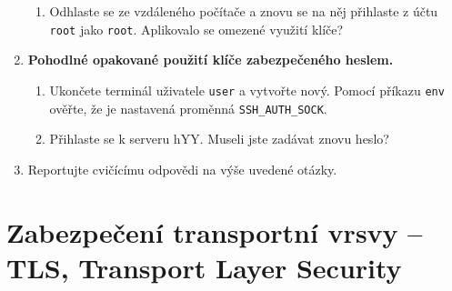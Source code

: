\documentclass[a4paper,11pt]{article}
\begin{document}
\begin{enumerate}
\begin{enumerate}
      \item Odhlaste se ze vzdáleného počítače a znovu se na něj přihlaste z
        účtu {\tt root} jako {\tt root}. Aplikovalo se
        omezené využití klíče?

    \end{enumerate}


  \item {\bf Pohodlné opakované použití klíče zabezpečeného heslem.}

    \begin{enumerate}

      \item Ukončete terminál uživatele {\tt user} a vytvořte nový. Pomocí
        příkazu \verb|env| ověřte, že je nastavená proměnná
        \verb|SSH_AUTH_SOCK|.

      \item Přihlaste se k serveru hYY. Museli jste zadávat znovu heslo?

    \end{enumerate}
  \item Reportujte cvičícímu odpovědi na výše uvedené otázky.

\end{enumerate}

\section{Zabezpečení transportní vrsvy -- TLS, Transport Layer Security}
\end{document}

